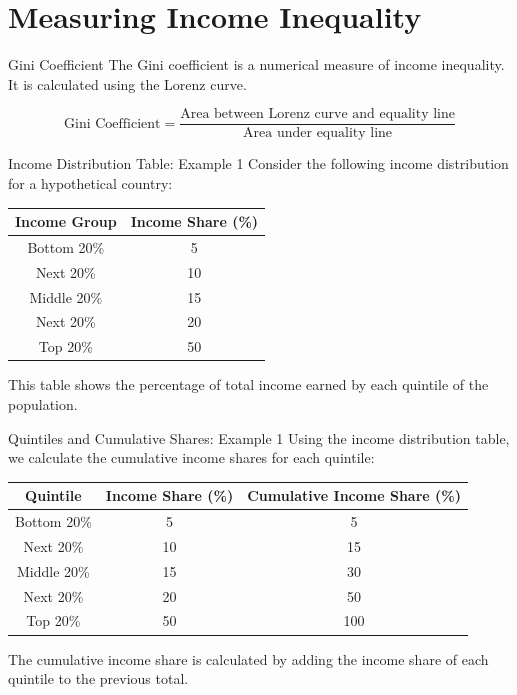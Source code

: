 \documentclass{beamer}
\begin{document}
\section{Measuring Income Inequality}

\begin{frame}{Gini Coefficient}
The Gini coefficient is a numerical measure of income inequality. It is calculated using the Lorenz curve.

\[
\text{Gini Coefficient} = \frac{\text{Area between Lorenz curve and equality line}}{\text{Area under equality line}}
\]
\end{frame}

\begin{frame}{Income Distribution Table: Example 1}
Consider the following income distribution for a hypothetical country:
\begin{table}[h]
\centering
\begin{tabular}{|c|c|}
\hline
\textbf{Income Group} & \textbf{Income Share (\%)} \\
\hline
Bottom 20\% & 5 \\
Next 20\% & 10 \\
Middle 20\% & 15 \\
Next 20\% & 20 \\
Top 20\% & 50 \\
\hline
\end{tabular}
\end{table}

This table shows the percentage of total income earned by each quintile of the population.
\end{frame}

\begin{frame}{Quintiles and Cumulative Shares: Example 1}
Using the income distribution table, we calculate the cumulative income shares for each quintile:
\begin{table}[h]
\centering
\begin{tabular}{|c|c|c|}
\hline
\textbf{Quintile} & \textbf{Income Share (\%)} & \textbf{Cumulative Income Share (\%)} \\
\hline
Bottom 20\% & 5 & 5 \\
Next 20\% & 10 & 15 \\
Middle 20\% & 15 & 30 \\
Next 20\% & 20 & 50 \\
Top 20\% & 50 & 100 \\
\hline
\end{tabular}
\end{table}

The cumulative income share is calculated by adding the income share of each quintile to the previous total.
\end{frame}
\end{document}
